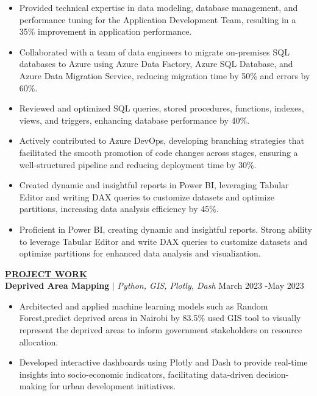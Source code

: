 \documentclass{article}
\begin{document}
\begin{itemize}[noitemsep,nolistsep,leftmargin=*]
\item {Provided technical expertise in data modeling, database management, and performance tuning for the Application Development Team, resulting in a 35\% improvement in application performance.}
\item {Collaborated with a team of data engineers to migrate on-premises SQL databases to Azure using Azure Data Factory, Azure SQL Database, and Azure Data Migration Service, reducing migration time by 50\% and errors by 60\%.}
\item {Reviewed and optimized SQL queries, stored procedures, functions, indexes, views, and triggers, enhancing database performance by 40\%.}
\item {Actively contributed to Azure DevOps, developing branching strategies that facilitated the smooth promotion of code changes across stages, ensuring a well-structured pipeline and reducing deployment time by 30\%.}
\item {Created dynamic and insightful reports in Power BI, leveraging Tabular Editor and writing DAX queries to customize datasets and optimize partitions, increasing data analysis efficiency by 45\%.}
\item {Proficient in Power BI, creating dynamic and insightful reports. Strong ability to leverage Tabular Editor and write DAX queries to customize datasets and optimize partitions for enhanced data analysis and visualization.\\}

\end{itemize}


%
%
\noindent \textbf{\underline{PROJECT WORK}} \\
\noindent \textbf{Deprived Area Mapping} $\mid$\textit{ Python, GIS, Plotly, Dash} \hfill  March 2023 -May 2023
\begin{itemize}[noitemsep,nolistsep,leftmargin=*]
\item {Architected and applied machine learning models such as Random Forest,predict deprived areas in Nairobi by 83.5\% used GIS tool to visually represent the deprived areas to inform government stakeholders on resource allocation.}
\item {Developed interactive dashboards using Plotly and Dash to provide real-time insights into socio-economic indicators, facilitating data-driven decision-making for urban development initiatives.}
\end{itemize}
\end{document}
